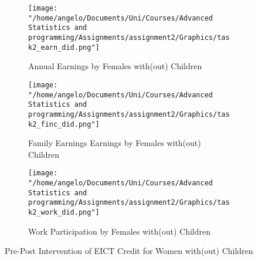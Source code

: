 \documentclass[a4paper]{article}
\begin{document}
\begin{wrapfigure}{L}{9cm}
\centering
\begin{subfigure}[b]{0.48\textwidth}
    \texttt{[image: "/home/angelo/Documents/Uni/Courses/Advanced Statistics and programming/Assignments/assignment2/Graphics/task2\_earn\_did.png"]} 
   \caption{Annual Earnings by Females with(out) Children}
   \label{fig:Ng2}
\end{subfigure}

\begin{subfigure}[b]{0.48\textwidth}
    \texttt{[image: "/home/angelo/Documents/Uni/Courses/Advanced Statistics and programming/Assignments/assignment2/Graphics/task2\_finc\_did.png"]} 
   \caption{Family Earnings Earnings by Females with(out) Children}
   \label{fig:Ng2}
\end{subfigure}

\begin{subfigure}[b]{0.48\textwidth}
    \texttt{[image: "/home/angelo/Documents/Uni/Courses/Advanced Statistics and programming/Assignments/assignment2/Graphics/task2\_work\_did.png"]}  
   \caption{Work Participation by Females with(out) Children}
   \label{fig:Ng2}
\end{subfigure}
\captionsetup{justification=centering}
\caption{Pre-Post Intervention of EICT Credit for Women with(out) Children}
\end{wrapfigure}
\end{document}
